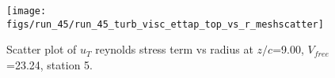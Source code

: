 \begin{figure}[H]
\centering
\texttt{[image: figs/run\_45/run\_45\_turb\_visc\_ettap\_top\_vs\_r\_meshscatter]}
\caption{Scatter plot of $
u_T$ reynolds stress term vs radius at $z/c$=9.00, $V_{free}$=23.24, station 5.}
\label{fig:run_45_turb_visc_ettap_top_vs_r_meshscatter}
\end{figure}


